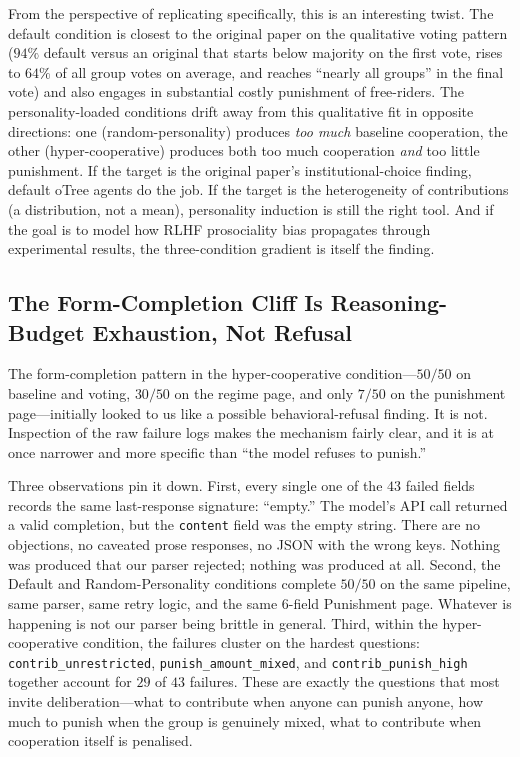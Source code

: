 \documentclass[12pt, a4paper]{article}
\begin{document}
From the perspective of replicating \citet{ertan2009who} specifically, this is an interesting twist. The default condition is closest to the original paper on the qualitative voting pattern ($94\%$ default versus an original that starts below majority on the first vote, rises to $64\%$ of all group votes on average, and reaches ``nearly all groups'' in the final vote) and also engages in substantial costly punishment of free-riders. The personality-loaded conditions drift away from this qualitative fit in opposite directions: one (random-personality) produces \emph{too much} baseline cooperation, the other (hyper-cooperative) produces both too much cooperation \emph{and} too little punishment. If the target is the original paper's institutional-choice finding, default oTree agents do the job. If the target is the heterogeneity of contributions (a distribution, not a mean), personality induction is still the right tool. And if the goal is to model how RLHF prosociality bias propagates through experimental results, the three-condition gradient is itself the finding.

\subsection{The Form-Completion Cliff Is Reasoning-Budget Exhaustion, Not Refusal}

The form-completion pattern in the hyper-cooperative condition---$50/50$ on baseline and voting, $30/50$ on the regime page, and only $7/50$ on the punishment page---initially looked to us like a possible behavioral-refusal finding. It is not. Inspection of the raw failure logs makes the mechanism fairly clear, and it is at once narrower and more specific than ``the model refuses to punish.''

Three observations pin it down. First, every single one of the $43$ failed fields records the same last-response signature: ``empty.'' The model's API call returned a valid completion, but the \texttt{content} field was the empty string. There are no objections, no caveated prose responses, no JSON with the wrong keys. Nothing was produced that our parser rejected; nothing was produced at all. Second, the Default and Random-Personality conditions complete $50/50$ on the same pipeline, same parser, same retry logic, and the same $6$-field Punishment page. Whatever is happening is not our parser being brittle in general. Third, within the hyper-cooperative condition, the failures cluster on the hardest questions: \texttt{contrib\_unrestricted}, \texttt{punish\_amount\_mixed}, and \texttt{contrib\_punish\_high} together account for $29$ of $43$ failures. These are exactly the questions that most invite deliberation---what to contribute when anyone can punish anyone, how much to punish when the group is genuinely mixed, what to contribute when cooperation itself is penalised.
\end{document}
